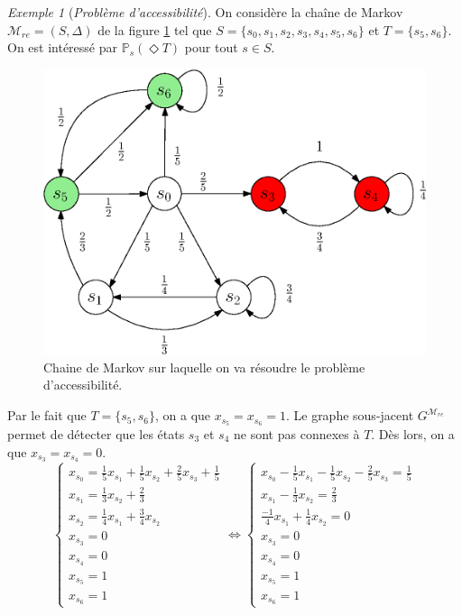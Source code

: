 \documentclass[12pt,a4paper]{report}
\theoremstyle{definition}%
\theoremstyle{remark}
\newtheorem{example}{Exemple}[chapter]
\begin{document}
\begin{example}[\textit{Problème d'accessibilité}]\label{reachex}
	On considère la chaîne de Markov $\mathcal{M}_{re} = (S, \Delta)$ de la figure \ref{reachability-example} tel que $S = \{s_0, s_1, s_2, s_3, s_4, s_5, s_6\}$ et  $T = \{ s_5, s_6 \}$. On est intéressé par $\mathbb{P}_s(\Diamond T)$ pour tout $s \in S$.
	\begin{figure}[H]
		\centering
		\includegraphics[scale=0.7]{figures/reachability-example.eps}
		\caption{Chaine de Markov sur laquelle on va résoudre le problème d'accessibilité.}
		\label{reachability-example}
	\end{figure}

	Par le fait que $T = \{s_5, s_6\}$, on a que $x_{s_5} = x_{s_6} = 1$. Le graphe sous-jacent $G^{\mathcal{M}_{re}}$ permet de détecter que %
	les états $s_3$ et $s_4$ ne sont pas connexes à $T$. Dès lors, on a que $x_{s_3} = x_{s_4} = 0$.
	\[
	\begin{cases}
	x_{s_0} = \frac{1}{5} x_{s_1} + \frac{1}{5} x_{s_2} + \frac{2}{5} x_{s_3} + \frac{1}{5} \\
	x_{s_1} = \frac{1}{3} x_{s_2} + \frac{2}{3} \\
	x_{s_2} = \frac{1}{4} x_{s_1} + \frac{3}{4} x_{s_2} \\
	x_{s_3} = 0 \\
	x_{s_4} = 0 \\
	x_{s_5} = 1 \\
	x_{s_6} = 1
	\end{cases}
	\iff
	\begin{cases}
	x_{s_0} - \frac{1}{5} x_{s_1} - \frac{1}{5} x_{s_2} - \frac{2}{5} x_{s_3} = \frac{1}{5} \\
	x_{s_1} - \frac{1}{3} x_{s_2} = \frac{2}{3} \\
	\frac{-1}{4} x_{s_1} + \frac{1}{4} x_{s_2} = 0 \\
	x_{s_3} = 0 \\
	x_{s_4} = 0 \\
	x_{s_5} = 1 \\
	x_{s_6} = 1
	\end{cases}
	\]


\end{example}
\end{document}
